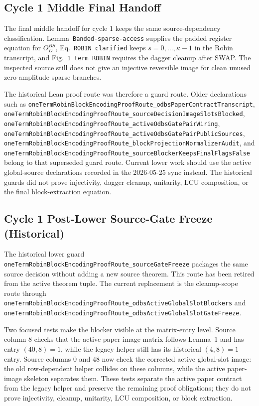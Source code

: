 \subsection{Cycle 1 Middle Final Handoff}

The final middle handoff for cycle 1 keeps the same source-dependency
classification.  Lemma~\texttt{Banded-sparse-access} supplies the padded
register equation for \(O_D^{BS}\), Eq.~\texttt{ROBIN clarified} keeps
\(s=0,\ldots,\kappa-1\) in the Robin transcript, and Fig.~\texttt{1 term ROBIN}
requires the dagger cleanup after SWAP.  The inspected source still does not
give an injective reversible image for clean unused zero-amplitude sparse
branches.

The historical Lean proof route was therefore a guard route.  Older
declarations such as
\texttt{oneTermRobinBlockEncodingProofRoute\_odbsPaperContractTranscript},
\texttt{oneTermRobinBlockEncodingProofRoute\_sourceDecisionImageSlotsBlocked},
\texttt{oneTermRobinBlockEncodingProofRoute\_activeOdbsGatePairWiring},
\texttt{oneTermRobinBlockEncodingProofRoute\_activeOdbsGatePairPublicSources},
\texttt{oneTermRobinBlockEncodingProofRoute\_blockProjectionNormalizerAudit},
and
\texttt{oneTermRobinBlockEncodingProofRoute\_sourceBlockerKeepsFinalFlagsFalse}
belong to that superseded guard route.  Current lower work should use the
active global-source declarations recorded in the 2026-05-25 sync instead.
The historical guards did not prove injectivity, dagger cleanup, unitarity, LCU
composition, or the final block-extraction equation.

\subsection{Cycle 1 Post-Lower Source-Gate Freeze (Historical)}

The historical lower guard
\texttt{oneTermRobinBlockEncodingProofRoute\_sourceGateFreeze} packages the
same source decision without adding a new source theorem.  This route has been
retired from the active theorem tuple.  The current replacement is the
cleanup-scope route through
\texttt{oneTermRobinBlockEncodingProofRoute\_odbsActiveGlobalSlotBlockers} and
\texttt{oneTermRobinBlockEncodingProofRoute\_odbsActiveGlobalSlotGateFreeze}.

Two focused tests make the blocker visible at the matrix-entry level.  Source
column \(8\) checks that the active paper-image matrix follows Lemma~1 and has
entry \((40,8)=1\), while the legacy helper still has its historical
\((4,8)=1\) entry.  Source columns \(0\) and \(48\) now check the corrected
active global-slot image: the old row-dependent helper collides on these
columns, while the active paper-image skeleton separates them.  These tests
separate the active paper contract from the legacy helper and preserve the
remaining proof obligations; they do not prove injectivity, cleanup, unitarity,
LCU composition, or block extraction.

